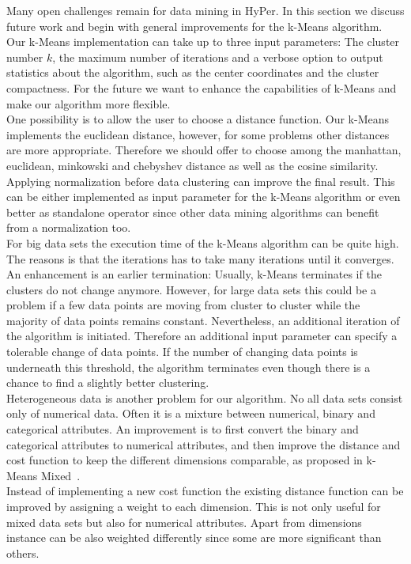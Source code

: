 Many open challenges remain for data mining in HyPer. In this section we discuss future work and begin with general improvements for the k-Means algorithm.
\\
Our k-Means implementation can take up to three input parameters: The cluster number $k$, the maximum number of iterations and a verbose option to output statistics about the algorithm, such as the center coordinates and the cluster compactness. For the future we want to enhance the capabilities of k-Means and make our algorithm more flexible. 
\\
One possibility is to allow the user to choose a distance function. Our k-Means implements the euclidean distance, however, for some problems other distances are more appropriate. Therefore we should offer to choose among the manhattan, euclidean, minkowski and chebyshev distance as well as the cosine similarity.
\\
Applying normalization before data clustering can improve the final result. This can be either implemented as input parameter for the k-Means algorithm or even better as standalone operator since other data mining algorithms can benefit from a normalization too.
\\
For big data sets the execution time of the k-Means algorithm can be quite high. The reasons is that the iterations has to take many iterations until it converges. An enhancement is an earlier termination: Usually, k-Means terminates if the clusters do not change anymore. However, for large data sets this could be a problem if a few data points are moving from cluster to cluster while the majority of data points remains constant. Nevertheless, an additional iteration of the algorithm is initiated. Therefore an additional input parameter can specify a tolerable change of data points. If the number of changing data points is underneath this threshold, the algorithm terminates even though there is a chance to find a slightly better clustering.
\\
Heterogeneous data is another problem for our algorithm. No all data sets consist only of numerical data. Often it is a mixture between numerical, binary and categorical attributes. An improvement is to first convert the binary and categorical attributes to numerical attributes, and then improve the distance and cost function to keep the different dimensions comparable, as proposed in k-Means Mixed~\parencite{ahmad2007kmean}.
\\
Instead of implementing a new cost function the existing distance function can be improved by assigning a weight to each dimension. This is not only useful for mixed data sets but also for numerical attributes. Apart from dimensions instance can be also weighted differently since some are more significant than others.
